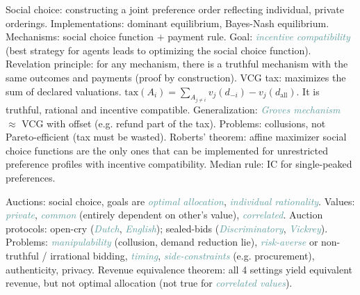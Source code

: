 \documentclass[10pt,a4paper,landscape]{article}
\newcommand{\concept}[1]{\textcolor{Emerald}{#1}} %
\newcommand{\subconcept}[1]{\textcolor{CadetBlue}{\textit{#1}}}
\renewcommand{\section}[1]{
    \vspace{-0.3cm}
    \begin{center}
      \color{Bittersweet}
      \hrulefill{\small~~#1~~}\hrulefill
    \end{center}
    \vspace{-0.3cm}
  }
\renewcommand{\subsection}[1]{\section{#1}}
\begin{document}
\begin{multicols*}{4}
\subsection{Mechanism design}

\concept{Social choice}: constructing a joint preference order reflecting individual, private orderings. Implementations: dominant equilibrium, Bayes-Nash equilibrium.
\concept{Mechanisms}: social choice function $+$ payment rule. Goal: \subconcept{incentive compatibility} (best strategy for agents leads to optimizing the social choice function).
\concept{Revelation principle}: for any mechanism, there is a truthful mechanism with the same outcomes and payments (proof by construction).
\concept{VCG tax}: maximizes the sum of declared valuations. $\text{tax}(A_i) = \sum_{A_{j \neq i}} v_j(d_{-i}) - v_j(d_{\text{all}})$. It is truthful, rational and incentive compatible. Generalization: \subconcept{Groves mechanism} $\approx$ VCG with offset (e.g. refund part of the tax). Problems: collusions, not Pareto-efficient (tax must be wasted).
\concept{Roberts' theorem}: affine maximizer social choice functions are the only ones that can be implemented for unrestricted preference profiles with incentive compatibility.
\concept{Median rule}: IC for single-peaked preferences.

\subsection{Auctions}

\concept{Auctions}: social choice, goals are \subconcept{optimal allocation}, \subconcept{individual rationality}.
\concept{Values}: \subconcept{private}, \subconcept{common} (entirely dependent on other's value), \subconcept{correlated}.
\concept{Auction protocols}: open-cry (\subconcept{Dutch}, \subconcept{English}); sealed-bids (\subconcept{Discriminatory}, \subconcept{Vickrey}). Problems: \subconcept{manipulability} (collusion, demand reduction lie), \subconcept{risk-averse} or non-truthful / irrational bidding, \subconcept{timing}, \subconcept{side-constraints} (e.g. procurement), authenticity, privacy.
\concept{Revenue equivalence theorem}: all 4 settings yield equivalent revenue, but not optimal allocation (not true for \subconcept{correlated values}).


\end{multicols*}
\end{document}
